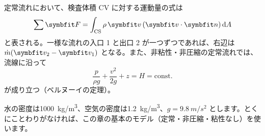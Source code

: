 \begin{senmonsho}[運動量の法則とベルヌーイの定理]
\begin{bkhonbun}
定常流れにおいて、検査体積 CV に対する運動量の式は
\[ \sum\symbfit F=\int_{\mathrm{CS}}\rho\,\symbfit v\,(\symbfit v\cdot\symbfit n)\,\mathrm{d}A \]
と表される。一様な流れの入口 1 と出口 2 が一つずつであれば、右辺は $\dot m(\symbfit v_2-\symbfit v_1)$ となる。また、非粘性・非圧縮の定常流れでは、流線に沿って
\[ \frac{p}{\rho g}+\frac{v^2}{2g}+z=H=\text{const.} \]
が成り立つ（ベルヌーイの定理）。
\end{bkhonbun}
\end{senmonsho}



\noindent 水の密度は\qty{1000}{kg/m^3}、空気の密度は\qty{1.2}{kg/m^3}、$g=\qty{9.8}{m/s^2}$ とします。とくにことわりがなければ、この章の基本のモデル（定常・非圧縮・粘性なし）を使います。

